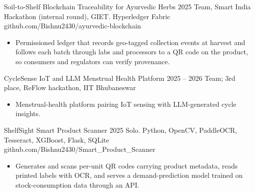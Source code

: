 \cvgap

\cvproject
{Soil-to-Shelf}
{Blockchain Traceability for Ayurvedic Herbs}
{2025}
{Team, Smart India Hackathon (internal round), GIET. Hyperledger Fabric}
{github.com/Bishnu2430/ayurvedic-blockchain}
{}
\begin{itemize}
\item Permissioned ledger that records geo-tagged collection events at harvest and follows each batch through labs and processors to a QR code on the product, so consumers and regulators can verify provenance.
\end{itemize}

\cvgap

\cvproject
{CycleSense}
{IoT and LLM Menstrual Health Platform}
{2025 -- 2026}
{Team; 3rd place, ReFlow hackathon, IIT Bhubaneswar}
{}
{}
\begin{itemize}
\item Menstrual-health platform pairing IoT sensing with LLM-generated cycle insights.
\end{itemize}

\cvgap

\cvproject
{ShelfSight}
{Smart Product Scanner}
{2025}
{Solo. Python, OpenCV, PaddleOCR, Tesseract, XGBoost, Flask, SQLite}
{github.com/Bishnu2430/Smart\_Product\_Scanner}
{}
\begin{itemize}
\item Generates and scans per-unit QR codes carrying product metadata, reads printed labels with OCR, and serves a demand-prediction model trained on stock-consumption data through an API.
\end{itemize}
